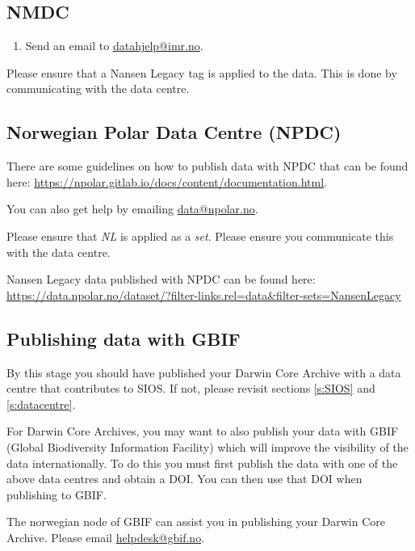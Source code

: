 \documentclass[a4paper,english, 11pt]{article}
\begin{document}
\subsection{NMDC}
\label{ss:NMDC}

\begin{enumerate}
\item Send an email to \href{mailto:datahjelp@imr.no}{datahjelp@imr.no}.
\end{enumerate}

Please ensure that a Nansen Legacy tag is applied to the data. This is done by communicating with the data centre.

\subsection{Norwegian Polar Data Centre (NPDC)}
\label{ss:NPI}

There are some guidelines on how to publish data with NPDC that can be found here: \url{https://npolar.gitlab.io/docs/content/documentation.html}.

You can also get help by emailing \href{mailto:data@npolar.no}{data@npolar.no}.

Please ensure that \textit{NL} is applied as a \textit{set}. Please ensure you communicate this with the data centre.

Nansen Legacy data published with NPDC can be found here:
\url{https://data.npolar.no/dataset/?filter-links.rel=data&filter-sets=NansenLegacy}

\subsection{Publishing data with GBIF}
\label{ss:publishingGBIF}

By this stage you should have published your Darwin Core Archive with a data centre that contributes to SIOS. If not, please revisit sections \ref{s:SIOS} and \ref{s:datacentre}.

For Darwin Core Archives, you may want to also publish your data with GBIF (Global Biodiversity Information Facility) which will improve the visibility of the data internationally. To do this you must first publish the data with one of the above data centres and obtain a DOI. You can then use that DOI when publishing to GBIF.

The norwegian node of GBIF can assist you in publishing your Darwin Core Archive. Please email \href{mailto:helpdesk@gbif.no}{helpdesk@gbif.no}.
\end{document}
